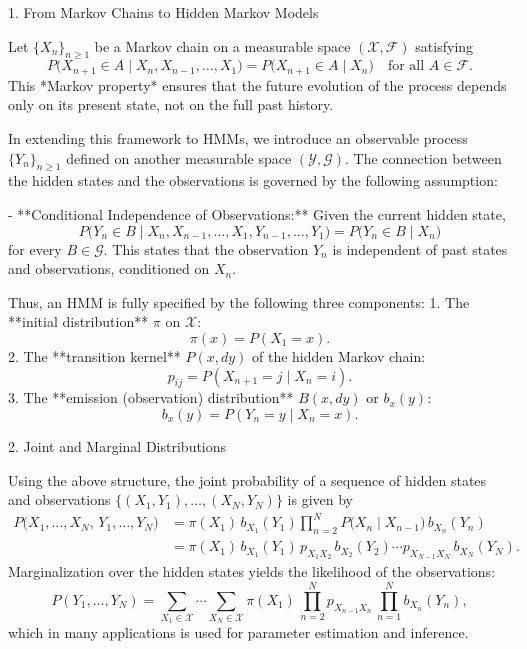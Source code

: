 \documentclass[12pt,a4paper]{article}
\begin{document}
1. From Markov Chains to Hidden Markov Models

Let \(\{X_n\}_{n \ge 1}\) be a Markov chain on a measurable space \((\mathcal{X}, \mathcal{F})\) satisfying
\[
P\bigl(X_{n+1} \in A \mid X_n, X_{n-1}, \dots, X_1\bigr) = P\bigl(X_{n+1} \in A \mid X_n\bigr) \quad \text{for all } A \in \mathcal{F}.
\]
This *Markov property* ensures that the future evolution of the process depends only on its present state, not on the full past history.

In extending this framework to HMMs, we introduce an observable process \(\{Y_n\}_{n \ge 1}\) defined on another measurable space \((\mathcal{Y}, \mathcal{G})\). The connection between the hidden states and the observations is governed by the following assumption:

- **Conditional Independence of Observations:** Given the current hidden state,
  \[
  P\bigl(Y_n \in B \mid X_n, X_{n-1}, \dots, X_1, Y_{n-1}, \dots, Y_1\bigr) = P\bigl(Y_n \in B \mid X_n\bigr)
  \]
  for every \(B \in \mathcal{G}\). This states that the observation \(Y_n\) is independent of past states and observations, conditioned on \(X_n\).

Thus, an HMM is fully specified by the following three components:
1. The **initial distribution** \(\pi\) on \(\mathcal{X}\):
   \[
   \pi(x) = P(X_1 = x).
   \]
2. The **transition kernel** \(P(x, dy)\) of the hidden Markov chain:
   \[
   p_{ij} = P(X_{n+1} = j \mid X_n = i).
   \]
3. The **emission (observation) distribution** \(B(x, dy)\) or \(b_x(y)\):
   \[
   b_x(y) = P(Y_n = y \mid X_n = x).
   \]

2. Joint and Marginal Distributions

Using the above structure, the joint probability of a sequence of hidden states and observations \(\{(X_1, Y_1), \dots, (X_N, Y_N)\}\) is given by
\[
\begin{aligned}
P\bigl(X_1, \dots, X_N,\, Y_1, \dots, Y_N\bigr) 
&= \pi(X_1) \, b_{X_1}(Y_1) \prod_{n=2}^N P\bigl(X_n \mid X_{n-1}\bigr) \, b_{X_n}(Y_n)\\[1mm]
&= \pi(X_1)\, b_{X_1}(Y_1)\, p_{X_1X_2}\, b_{X_2}(Y_2) \cdots p_{X_{N-1}X_N}\, b_{X_N}(Y_N).
\end{aligned}
\]
Marginalization over the hidden states yields the likelihood of the observations:
\[
P(Y_1, \dots, Y_N) = \sum_{X_1 \in \mathcal{X}} \cdots \sum_{X_N \in \mathcal{X}} \pi(X_1)\, \prod_{n=2}^N p_{X_{n-1}X_n}\, \prod_{n=1}^N b_{X_n}(Y_n),
\]
which in many applications is used for parameter estimation and inference.
\end{document}
